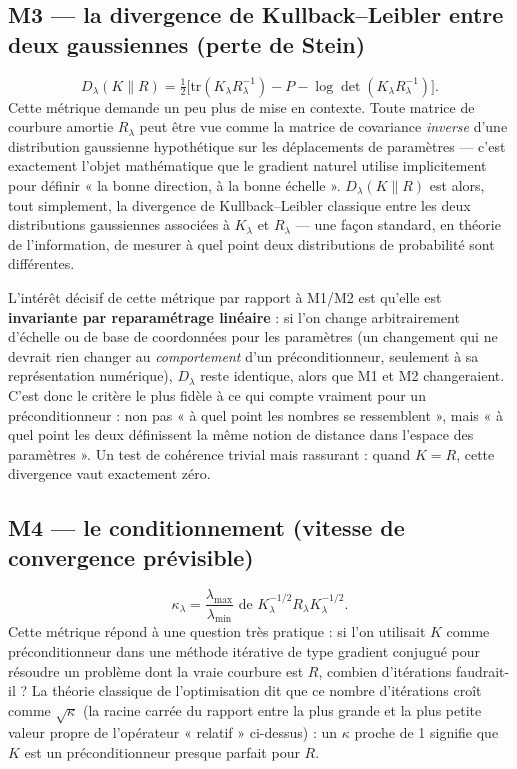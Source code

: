 \documentclass[11pt,a4paper]{article}
\begin{document}
\subsection{M3 — la divergence de Kullback--Leibler entre deux gaussiennes (perte de Stein)}

\[
D_\lambda(K\|R) = \tfrac12\Big[\mathrm{tr}(K_\lambda R_\lambda^{-1}) - P - \log\det(K_\lambda R_\lambda^{-1})\Big].
\]
Cette métrique demande un peu plus de mise en contexte. Toute matrice de courbure amortie $R_\lambda$
peut être vue comme la matrice de covariance \emph{inverse} d'une distribution gaussienne
hypothétique sur les déplacements de paramètres — c'est exactement l'objet mathématique que le
gradient naturel utilise implicitement pour définir « la bonne direction, à la bonne échelle ».
$D_\lambda(K\|R)$ est alors, tout simplement, la divergence de Kullback--Leibler classique entre les
deux distributions gaussiennes associées à $K_\lambda$ et $R_\lambda$ — une façon standard, en
théorie de l'information, de mesurer à quel point deux distributions de probabilité sont
différentes.

L'intérêt décisif de cette métrique par rapport à M1/M2 est qu'elle est \textbf{invariante par
reparamétrage linéaire} : si l'on change arbitrairement d'échelle ou de base de coordonnées pour les
paramètres (un changement qui ne devrait rien changer au \emph{comportement} d'un préconditionneur,
seulement à sa représentation numérique), $D_\lambda$ reste identique, alors que M1 et M2 changeraient.
C'est donc le critère le plus fidèle à ce qui compte vraiment pour un préconditionneur : non pas « à
quel point les nombres se ressemblent », mais « à quel point les deux définissent la même notion de
distance dans l'espace des paramètres ». Un test de cohérence trivial mais rassurant : quand $K=R$,
cette divergence vaut exactement zéro.

\subsection{M4 — le conditionnement (vitesse de convergence prévisible)}

\[
\kappa_\lambda = \frac{\lambda_{\max}}{\lambda_{\min}} \text{ de } K_\lambda^{-1/2}R_\lambda K_\lambda^{-1/2}.
\]
Cette métrique répond à une question très pratique : si l'on utilisait $K$ comme préconditionneur
dans une méthode itérative de type gradient conjugué pour résoudre un problème dont la vraie
courbure est $R$, combien d'itérations faudrait-il ? La théorie classique de l'optimisation dit que
ce nombre d'itérations croît comme $\sqrt{\kappa}$ (la racine carrée du rapport entre la plus grande
et la plus petite valeur propre de l'opérateur « relatif » ci-dessus) : un $\kappa$ proche de 1
signifie que $K$ est un préconditionneur presque parfait pour $R$.
\end{document}
